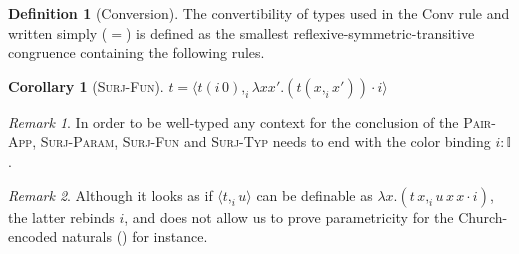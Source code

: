 \documentclass[english]{PaperTools/latex/entcs}
\theoremstyle{plain}
\newtheorem{corollary}[theorem]{Corollary}
\theoremstyle{definition}
\newtheorem{definition}[theorem]{Definition}
\theoremstyle{remark}
\newtheorem*{remark}{Remark}
\newcommand\CP[3]{(#2,_{#1} #3)}
\newcommand\CTimes[2]{(#2) ×_{#1}}
\newcommand\param[1]{\!\cdot\!#1}
\newcommand\op[1]{∋_{#1}}
\newcommand\fp[3]{⟨#2 ,_{#1} #3⟩}
\newcommand\mor[2]{({#1}\,{#2})}
\newcommand\proj[2]{{#2}\mor{#1}0}
\def\El#1{\mathrm{El}(#1)}
\begin{document}
\vspace{-.25\baselineskip}
\begin{definition}[Conversion]
\label{def:conversion}
The convertibility of types used in the {\sc Conv} rule and written
simply ($=$) is defined as the smallest reflexive-symmetric-transitive
congruence containing the following rules.
\end{definition}
%
\begin{corollary}[\textsc{Surj-Fun}]
  \label{cor:surj-fun}
  $t = \fp i {\proj i t} {λx x'. (t \CP i x {x'}) \param i}$
\end{corollary}

\vspace{-.25\baselineskip}
\begin{remark}
  In order to be well-typed any context for the conclusion of the
  \textsc{Pair-App}, \textsc{Surj-Param}, \textsc{Surj-Fun} and
  \textsc{Surj-Typ} needs to end with the color binding $i : 𝕀$.
\end{remark}
\begin{remark}
  Although it looks as if $\fp i t u$ can be definable as
  $λx. \CP i {t\,x} {u\, x\, x\param i}$, the latter rebinds $i$, and
  does not allow us to prove parametricity for the Church-encoded
  naturals () for instance.
\end{remark}

\end{document}

